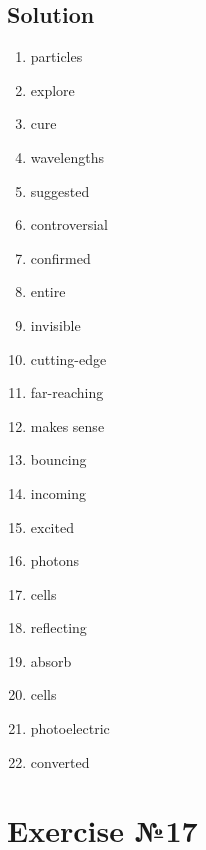 \subsection*{Solution}
\begin{enumerate}
      \item particles
      \item explore
      \item cure
      \item wavelengths
      \item suggested
      \item controversial
      \item confirmed
      \item entire
      \item invisible
      \item cutting-edge
      \item far-reaching
      \item makes sense
      \item bouncing
      \item incoming
      \item excited
      \item photons
      \item cells
      \item reflecting
      \item absorb
      \item cells
      \item photoelectric
      \item converted
\end{enumerate}

\section{Exercise №17}
